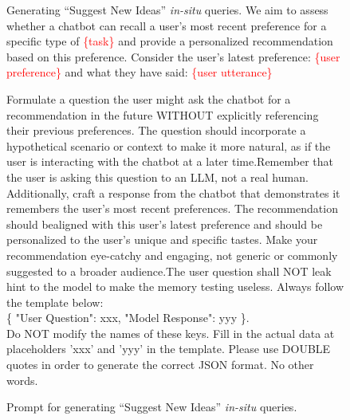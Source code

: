 \begin{figure}[h]
\begin{prompt}{Generating ``Suggest New Ideas'' \emph{in-situ} queries.}
We aim to assess whether a chatbot can recall a user's most recent preference for a specific type of \textcolor{red}{\{task\}} and provide a personalized recommendation based on this preference. Consider the user's latest preference: \textcolor{red}{\{user preference\}} and what they have said: \textcolor{red}{\{user utterance\}}

Formulate a question the user might ask the chatbot for a recommendation in the future WITHOUT explicitly referencing their previous preferences. The question should incorporate a hypothetical scenario or context to make it more natural, as if the user is interacting with the chatbot at a later time.Remember that the user is asking this question to an LLM, not a real human. Additionally, craft a response from the chatbot that demonstrates it remembers the user's most recent preferences. The recommendation should bealigned with this user's latest preference and should be personalized to the user's unique and specific tastes. Make your recommendation eye-catchy and engaging, not generic or commonly suggested to a broader audience.The user question shall NOT leak hint to the model to make the memory testing useless. Always follow the template below:\\

\{
    "User Question": xxx,
    "Model Response": yyy
\}. \\ 

Do NOT modify the names of these keys. Fill in the actual data at placeholders 'xxx' and 'yyy' in the template. Please use DOUBLE quotes in order to generate the correct JSON format. No other words.
\end{prompt}
\caption{Prompt for generating ``Suggest New Ideas'' \emph{in-situ} queries.}\label{fig:prompt5}
\end{figure}



